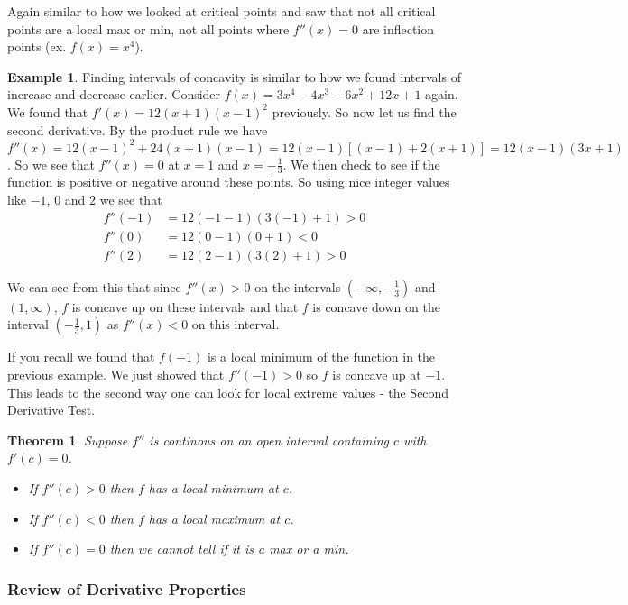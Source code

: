\documentclass[12pt,reqno]{article}
\newtheorem{Theorem}{Theorem}
\theoremstyle{definition}
\newtheorem*{Example}{Example}
\begin{document}
Again similar to how we looked at critical points and saw that not all critical points are a local max or min, not all points where $f''(x) = 0$ are inflection points (ex. $f(x) = x^4$). 

\begin{Example}
Finding intervals of concavity is similar to how we found intervals of increase and decrease earlier. Consider $f(x) = 3x^4 - 4x^3 - 6x^2 + 12 x + 1$ again. We found that $f'(x) = 12(x + 1)(x - 1)^2$ previously. So now let us find the second derivative. By the product rule we have $f''(x) = 12 (x - 1)^2 + 24(x + 1)(x - 1) = 12(x - 1)[(x - 1) + 2(x + 1)] = 12(x - 1)(3x + 1)$. So we see that $f''(x) = 0$ at $x = 1$ and $x = -\frac{1}{3}$. We then check to see if the function is positive or negative around these points. So using nice integer values like $-1$, $0$ and $2$ we see that 
	\begin{align*}
		f''(-1) &= 12(- 1 - 1)(3(-1) + 1) > 0 \\
		f''(0) &= 12 (0 - 1)(0 + 1) < 0 \\
		f''(2) &= 12 (2 - 1) (3(2) + 1) > 0
	\end{align*}
	
	We can see from this that since $f''(x) > 0$ on the intervals $(-\infty, -\frac{1}{3})$ and $(1, \infty)$, $f$ is concave up on these intervals and that $f$ is concave down on the interval $(-\frac{1}{3}, 1)$ as $f''(x) < 0$ on this interval. 
\end{Example}

If you recall we found that $f(-1)$ is a local minimum of the function in the previous example. We just showed that $f''(-1) > 0$ so $f$ is concave up at $-1$. This leads to the second way one can look for local extreme values - the Second Derivative Test. 
\begin{Theorem} 
	Suppose $f''$ is continous on an open interval containing $c$ with $f'(c) = 0$. 
	\begin{itemize}
		\item If $f''(c) > 0$ then $f$ has a local minimum at $c$. 
		\item If $f''(c) < 0$ then $f$ has a local maximum at $c$. 
		\item If $f''(c) = 0$ then we cannot tell if it is a max or a min. 
	\end{itemize}
\end{Theorem}

\subsubsection{Review of Derivative Properties}
\end{document}
